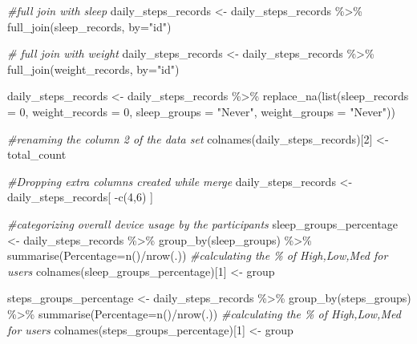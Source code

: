 \documentclass[
]{article}
\newenvironment{Shaded}{\begin{snugshade}}{\end{snugshade}}
\newcommand{\AttributeTok}[1]{\textcolor[rgb]{0.77,0.63,0.00}{#1}}
\newcommand{\CommentTok}[1]{\textcolor[rgb]{0.56,0.35,0.01}{\textit{#1}}}
\newcommand{\DecValTok}[1]{\textcolor[rgb]{0.00,0.00,0.81}{#1}}
\newcommand{\FunctionTok}[1]{\textcolor[rgb]{0.00,0.00,0.00}{#1}}
\newcommand{\NormalTok}[1]{#1}
\newcommand{\OtherTok}[1]{\textcolor[rgb]{0.56,0.35,0.01}{#1}}
\newcommand{\SpecialCharTok}[1]{\textcolor[rgb]{0.00,0.00,0.00}{#1}}
\newcommand{\StringTok}[1]{\textcolor[rgb]{0.31,0.60,0.02}{#1}}
\begin{document}
\begin{Shaded}
\begin{Highlighting}[]
    
      
\CommentTok{\#full join with sleep}
\NormalTok{daily\_steps\_records }\OtherTok{\textless{}{-}} 
\NormalTok{  daily\_steps\_records       }\SpecialCharTok{\%\textgreater{}\%} 
  \FunctionTok{full\_join}\NormalTok{(sleep\_records, }\AttributeTok{by=}\StringTok{"id"}\NormalTok{)}
  
\CommentTok{\# full join with weight}
\NormalTok{daily\_steps\_records }\OtherTok{\textless{}{-}} 
\NormalTok{  daily\_steps\_records       }\SpecialCharTok{\%\textgreater{}\%} 
  \FunctionTok{full\_join}\NormalTok{(weight\_records, }\AttributeTok{by=}\StringTok{"id"}\NormalTok{) }

\NormalTok{daily\_steps\_records }\OtherTok{\textless{}{-}} 
\NormalTok{  daily\_steps\_records }\SpecialCharTok{\%\textgreater{}\%}
  \FunctionTok{replace\_na}\NormalTok{(}\FunctionTok{list}\NormalTok{(}\AttributeTok{sleep\_records =} \DecValTok{0}\NormalTok{, }\AttributeTok{weight\_records =} \DecValTok{0}\NormalTok{, }\AttributeTok{sleep\_groups =} \StringTok{"Never"}\NormalTok{, }\AttributeTok{weight\_groups =} \StringTok{"Never"}\NormalTok{))}


\CommentTok{\#renaming the column 2 of the data set}
\FunctionTok{colnames}\NormalTok{(daily\_steps\_records)[}\DecValTok{2}\NormalTok{] }\OtherTok{\textless{}{-}} \StringTok{\textquotesingle{}total\_count\textquotesingle{}}


\CommentTok{\#Dropping extra columns created while merge}
\NormalTok{daily\_steps\_records }\OtherTok{\textless{}{-}}\NormalTok{ daily\_steps\_records[ }\SpecialCharTok{{-}}\FunctionTok{c}\NormalTok{(}\DecValTok{4}\NormalTok{,}\DecValTok{6}\NormalTok{) ]}

      
      
  \CommentTok{\#categorizing overall device usage by the participants    }
\NormalTok{    sleep\_groups\_percentage }\OtherTok{\textless{}{-}}\NormalTok{   daily\_steps\_records }\SpecialCharTok{\%\textgreater{}\%} \FunctionTok{group\_by}\NormalTok{(sleep\_groups) }\SpecialCharTok{\%\textgreater{}\%} \FunctionTok{summarise}\NormalTok{(}\AttributeTok{Percentage=}\FunctionTok{n}\NormalTok{()}\SpecialCharTok{/}\FunctionTok{nrow}\NormalTok{(.)) }\CommentTok{\#calculating the \% of High,Low,Med for users}
      \FunctionTok{colnames}\NormalTok{(sleep\_groups\_percentage)[}\DecValTok{1}\NormalTok{] }\OtherTok{\textless{}{-}} \StringTok{\textquotesingle{}group\textquotesingle{}}
    
\NormalTok{    steps\_groups\_percentage }\OtherTok{\textless{}{-}}\NormalTok{   daily\_steps\_records }\SpecialCharTok{\%\textgreater{}\%} \FunctionTok{group\_by}\NormalTok{(steps\_groups) }\SpecialCharTok{\%\textgreater{}\%} \FunctionTok{summarise}\NormalTok{(}\AttributeTok{Percentage=}\FunctionTok{n}\NormalTok{()}\SpecialCharTok{/}\FunctionTok{nrow}\NormalTok{(.))  }\CommentTok{\#calculating the \% of High,Low,Med for users}
          \FunctionTok{colnames}\NormalTok{(steps\_groups\_percentage)[}\DecValTok{1}\NormalTok{] }\OtherTok{\textless{}{-}} \StringTok{\textquotesingle{}group\textquotesingle{}}


\end{Highlighting}
\end{Shaded}
\end{document}
